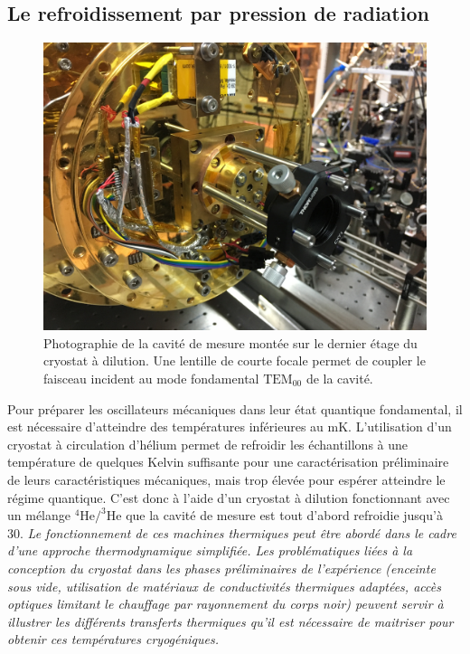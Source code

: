 \documentclass[12pt,a4paper]{article}
\begin{document}
\subsection{Le refroidissement par pression de radiation}

\begin{figure}
\center
\includegraphics[scale=0.05]{figures/IMG_1766.JPG}
\caption{Photographie de la cavité de mesure montée sur le dernier étage du cryostat à dilution.
Une lentille de courte focale permet de coupler le faisceau incident au mode fondamental $\mathrm{TEM_{00}}$ de la cavité.}
\end{figure}

Pour préparer les oscillateurs mécaniques dans leur état quantique fondamental, il est nécessaire d'atteindre des températures inférieures au mK.
L'utilisation d'un cryostat à circulation d'hélium permet de refroidir les échantillons à une température de quelques Kelvin suffisante pour une caractérisation préliminaire de leurs caractéristiques mécaniques, mais trop élevée pour espérer atteindre le régime quantique.
C'est donc à l'aide d'un cryostat à dilution fonctionnant avec un mélange $\mathrm{^4He/^3He}$ que la cavité de mesure est tout d'abord refroidie jusqu'à \unit{30}{\milli\kelvin}.
\textit{Le fonctionnement de ces machines thermiques peut être abordé dans le cadre d'une approche thermodynamique simplifiée.
Les problématiques liées à la conception du cryostat dans les phases préliminaires de l'expérience (enceinte sous vide, utilisation de matériaux de conductivités thermiques adaptées, accès optiques limitant le chauffage par rayonnement du corps noir) peuvent servir à illustrer les différents transferts thermiques qu'il est nécessaire de maitriser pour obtenir ces températures cryogéniques.}
\end{document}
